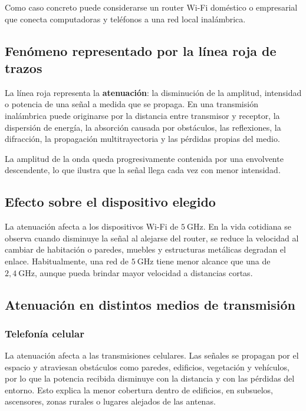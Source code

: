 ﻿\documentclass[12pt,a4paper]{article}
\begin{document}
Como caso concreto puede considerarse un router Wi-Fi doméstico o empresarial
que conecta computadoras y teléfonos a una red local inalámbrica.

\subsection{Fenómeno representado por la línea roja de trazos}

La línea roja representa la \textbf{atenuación}: la disminución de la amplitud,
intensidad o potencia de una señal a medida que se propaga. En una transmisión
inalámbrica puede originarse por la distancia entre transmisor y receptor, la
dispersión de energía, la absorción causada por obstáculos, las reflexiones, la
difracción, la propagación multitrayectoria y las pérdidas propias del medio.

La amplitud de la onda queda progresivamente contenida por una envolvente
descendente, lo que ilustra que la señal llega cada vez con menor intensidad.

\subsection{Efecto sobre el dispositivo elegido}

La atenuación afecta a los dispositivos Wi-Fi de $5\ \mathrm{GHz}$. En la vida
cotidiana se observa cuando disminuye la señal al alejarse del router, se reduce
la velocidad al cambiar de habitación o paredes, muebles y estructuras
metálicas degradan el enlace. Habitualmente, una red de $5\ \mathrm{GHz}$ tiene
menor alcance que una de $2{,}4\ \mathrm{GHz}$, aunque pueda brindar mayor
velocidad a distancias cortas.

\subsection{Atenuación en distintos medios de transmisión}

\subsubsection{Telefonía celular}

La atenuación afecta a las transmisiones celulares. Las señales se propagan por
el espacio y atraviesan obstáculos como paredes, edificios, vegetación y
vehículos, por lo que la potencia recibida disminuye con la distancia y con las
pérdidas del entorno. Esto explica la menor cobertura dentro de edificios, en
subsuelos, ascensores, zonas rurales o lugares alejados de las antenas.
\end{document}
